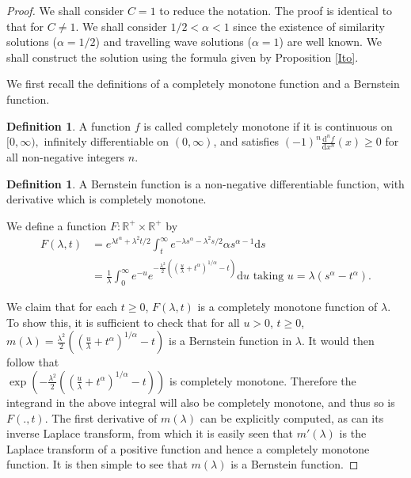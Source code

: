 \documentclass[11pt]{article}
\theoremstyle{plain}
\theoremstyle{remark}
\theoremstyle{definition}
\newtheorem{definition}[theorem]{Definition}
\numberwithin{equation}{section}
\begin{document}
\label{asymptoticappend}
\begin{proof}
We shall consider $C=1$ to reduce the notation. The proof is identical to that for $C\neq 1$. 
We shall consider $1/2<\alpha<1$ since the existence of similarity solutions ($\alpha=1/2$) and travelling wave solutions ($\alpha=1$) are well known. We shall construct the solution using the formula given by Proposition \ref{Ito}.

We first recall the definitions of a completely monotone function and a Bernstein function.
\begin{definition}
    A function $f$ is called completely monotone if it is continuous on $[0,\infty),$ infinitely differentiable on $(0,\infty)$, and satisfies $(-1)^n\frac{\textrm{d}^nf}{\textrm{d}x^n}(x)\geq 0$ for all non-negative integers $n$.
\end{definition}
\begin{definition}
    A Bernstein function is a non-negative differentiable function, with derivative which is completely monotone.
\end{definition}

We define a function $F:\mathbb{R}^+\times \mathbb{R^+}$ by
\begin{align*}
F(\lambda,t)&=e^{\lambda t^\alpha+\lambda^2t/2}\int_t^\infty e^{-\lambda s^\alpha-\lambda^2s/2}\alpha s^{\alpha-1}\textrm{d}s\\
    &=\frac{1}{\lambda}\int_0^\infty e^{-u}e^{-\frac{\lambda^2}{2}((\frac{u}{\lambda}+t^\alpha)^{1/\alpha}-t)} \textrm{d}u \textrm{ taking }u=\lambda(s^\alpha-t^\alpha).
\end{align*}

We claim that for each $t\geq 0$, $F(\lambda,t)$ is a completely monotone function of $\lambda$. To show this, it is sufficient to check that for all $u>0$, $t\geq 0$, \\$m( \lambda)=\frac{\lambda^2}{2}((\frac{u}{\lambda}+t^\alpha)^{1/\alpha}-t)$ is a Bernstein function in $\lambda$. It would then follow that
\\$\exp\left(-\frac{\lambda^2}{2}((\frac{u}{\lambda}+t^\alpha)^{1/\alpha}-t)\right)$ is completely monotone. Therefore the integrand in the above integral will also be completely monotone, and thus so is $F(.,t)$. The first derivative of $m(\lambda)$ can be explicitly computed, as can its inverse Laplace transform, from which it is easily seen that $m'(\lambda)$ is the Laplace transform of a positive function and hence a completely monotone function. It is then simple to see that $m(\lambda)$ is a Bernstein function.



\end{proof}
\end{document}
